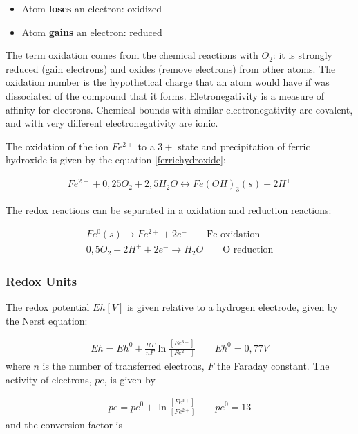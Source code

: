 \documentclass[11pt,twoside]{report}
\begin{document}
\begin{itemize}
   \item Atom \textbf{loses} an electron: oxidized
   \item Atom \textbf{gains} an electron: reduced
\end{itemize}

The term oxidation comes from the chemical reactions with $O_{2}$: it is strongly reduced (gain electrons) and oxides (remove electrons) from other atoms. The oxidation number is the hypothetical charge that an atom would have if was dissociated of the compound that it forms. Eletronegativity is a measure of affinity for electrons. Chemical bounds with similar electronegativity are covalent, and with very different electronegativity are ionic.

The oxidation of the ion $Fe^{2+}$ to a $3+$ state and precipitation of ferric hydroxide is given by the equation \eqref{ferrichydroxide}:

\begin{align}
   Fe^{2+} + 0,25 O_{2} + 2,5 H_{2}O \longleftrightarrow Fe(OH)_{3}(s) + 2 H^{+}
\end{align}

The redox reactions can be separated in a oxidation and reduction reactions:

\begin{align}
   Fe^{0}(s) \rightarrow Fe^{2+} + 2e^{-} \qquad \text{Fe oxidation} \\
   0,5 O_{2} + 2H^{+} + 2e^{-} \rightarrow H_{2}O \qquad \text{O reduction}
\end{align}

\subsubsection{Redox Units}
The redox potential $Eh [V]$ is given relative to a hydrogen electrode, given by the Nerst equation:

\begin{align}
   Eh  = Eh^{0} + \frac{RT}{nF}\ln \frac{[Fe^{3+}]}{[Fe^{2+}]} \qquad Eh^{0} = 0,77V
\end{align}
where $n$ is the number of transferred electrons, $F$ the Faraday constant. The activity of electrons, $pe$, is given by

\begin{align}
   pe = pe^{0} + \ln \frac{[Fe^{3+}]}{[Fe^{2+}]} \qquad pe^{0} = 13
\end{align}
and the conversion factor is
\end{document}
